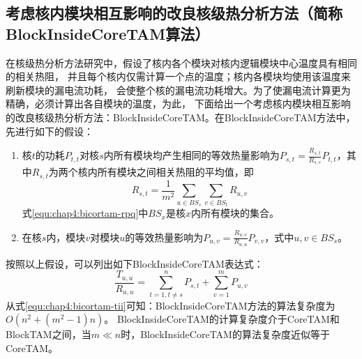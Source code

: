 \subsection{考虑核内模块相互影响的改良核级热分析方法（简称BlockInsideCoreTAM算法）}
在核级热分析方法研究中，假设了核内各个模块对核内逻辑模块中心温度具有相同的相关热阻， 并且每个核内仅需计算一个点的温度；核内各模块均使用该温度来刷新模块的漏电流功耗， 会使整个核的漏电流功耗增大。为了使漏电流计算更为精确，必须计算出各自模块的温度，为此， 下面给出一个考虑核内模块相互影响的改良核级热分析方法：BlockInsideCoreTAM。在BlockInsideCoreTAM方法中，先进行如下的假设：
\begin{enumerate}[1)]
\item 核$t$的功耗$P_{t,t}$对核$s$内所有模块均产生相同的等效热量影响为$P_{s,t} = \frac{R_{s,t}}{R_{s,s}}P_{t,t}$，其中$R_{s,t}$为两个核内所有模块之间相关热阻的平均值，即
\begin{equation}
\label{equ:chap4:bicortam-rpq}
R_{s,t} = \frac{1}{m^2}\sum\limits_{u \in BS_s}\sum\limits_{v \in BS_t}R_{u,v}
\end{equation}
式\ref{equ:chap4:bicortam-rpq}中$BS_x$是核$x$内所有模块的集合。
\item 在核$s$内，模块$v$对模块$u$的等效热量影响为$P_{u,v} = \frac{R_{u,v}}{R_{u,u}}P_{v,v}$，式中$u,v \in BS_s$。
\end{enumerate}
按照以上假设，可以列出如下BlockInsideCoreTAM表达式：
\begin{equation}
\label{equ:chap4:bicortam-tii}
\frac{T_{u,u}}{R_{u,u}} = \sum\limits_{t=1,t\neq s}^n P_{s,t} + \sum\limits_{v=1}^m P_{u,v}
\end{equation}
从式\ref{equ:chap4:bicortam-tii}可知：BlockInsideCoreTAM方法的算法复杂度为$O(n^2+(m^2-1)n)$。 BlockInsideCoreTAM的计算复杂度介于CoreTAM和BlockTAM之间，当$m \ll n$时，BlockInsideCoreTAM的算法复杂度近似等于CoreTAM。

